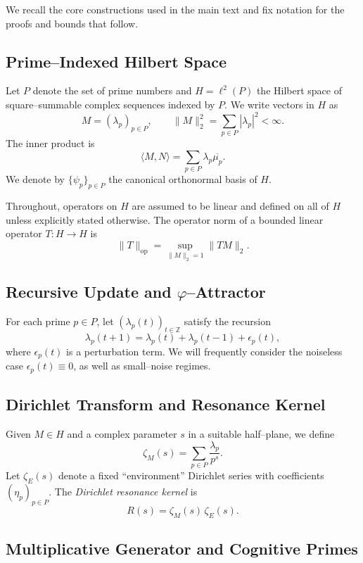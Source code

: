 \documentclass[11pt]{article}
\begin{document}
We recall the core constructions used in the main text and fix notation for the proofs and bounds that follow.

\subsection{Prime–Indexed Hilbert Space}

Let $P$ denote the set of prime numbers and $H = \ell^2(P)$ the Hilbert space of square–summable complex sequences indexed by $P$.
We write vectors in $H$ as
\[
M = (\lambda_p)_{p\in P}, \qquad \|M\|_2^2 = \sum_{p\in P} |\lambda_p|^2 < \infty.
\]
The inner product is
\[
\langle M, N \rangle = \sum_{p\in P} \lambda_p \overline{\mu_p}.
\]
We denote by $\{\psi_p\}_{p\in P}$ the canonical orthonormal basis of $H$.

Throughout, operators on $H$ are assumed to be linear and defined on all of $H$ unless explicitly stated otherwise.
The operator norm of a bounded linear operator $T:H\to H$ is
\[
\|T\|_{\mathrm{op}} = \sup_{\|M\|_2=1} \|T M\|_2.
\]

\subsection{Recursive Update and $\varphi$–Attractor}

For each prime $p\in P$, let $(\lambda_p(t))_{t\in\mathbb{Z}}$ satisfy the recursion
\begin{equation}
  \lambda_p(t+1) = \lambda_p(t) + \lambda_p(t-1) + \epsilon_p(t),
  \label{eq:appendix-fib}
\end{equation}
where $\epsilon_p(t)$ is a perturbation term.
We will frequently consider the noiseless case $\epsilon_p(t)\equiv 0$, as well as small–noise regimes.

\subsection{Dirichlet Transform and Resonance Kernel}

Given $M\in H$ and a complex parameter $s$ in a suitable half–plane, we define
\[
\zeta_M(s) = \sum_{p\in P} \frac{\lambda_p}{p^s}.
\]
Let $\zeta_E(s)$ denote a fixed ``environment'' Dirichlet series with coefficients $(\eta_p)_{p\in P}$.
The \emph{Dirichlet resonance kernel} is
\[
R(s) = \zeta_M(s)\,\zeta_E(s).
\]

\subsection{Multiplicative Generator and Cognitive Primes}
\end{document}
